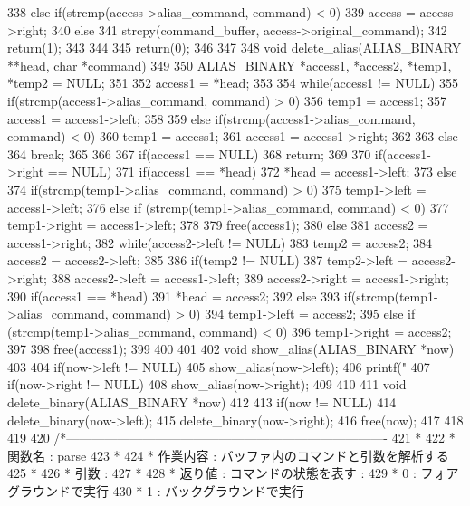 \documentclass{procreport}
\begin{document}
\begin{verbatimtab}
{{{   338			}else if(strcmp(access->alias_command, command) < 0){
   339				access = access->right;
   340			}else{
   341				strcpy(command_buffer, access->original_command);
   342				return(1);
   343			}
   344		}
   345			return(0);
   346	}
   347	
   348	void delete_alias(ALIAS_BINARY **head, char *command)
   349	{
   350		ALIAS_BINARY *access1, *access2, *temp1, *temp2 = NULL;
   351		
   352		access1 = *head;
   353		
   354		while(access1 != NULL){
   355			if(strcmp(access1->alias_command, command) > 0){
   356				temp1 = access1;
   357				access1 = access1->left;
   358			}
   359			else if(strcmp(access1->alias_command, command) < 0){
   360				temp1 = access1;
   361				access1 = access1->right;
   362			}
   363			else
   364				break;
   365		}
   366		
   367		if(access1 == NULL)
   368			return;
   369		
   370		if(access1->right == NULL){
   371			if(access1 == *head)
   372				*head = access1->left;
   373			else{
   374				if(strcmp(temp1->alias_command, command) > 0)
   375					temp1->left = access1->left;
   376				else if (strcmp(temp1->alias_command, command) < 0)
   377					temp1->right = access1->left;
   378			}
   379			free(access1);
   380		}else{
   381			access2 = access1->right;
   382			while(access2->left != NULL){
   383				temp2 = access2;
   384				access2 = access2->left;
   385			}
   386			if(temp2 != NULL)
   387				temp2->left = access2->right;
   388			access2->left = access1->left;
   389			access2->right = access1->right;
   390			if(access1 == *head)
   391				*head = access2;
   392			else{
   393				if(strcmp(temp1->alias_command, command) > 0)
   394					temp1->left = access2;
   395				else if (strcmp(temp1->alias_command, command) < 0)
   396					temp1->right = access2;
   397			}
   398			free(access1);
   399		}
   400	}
   401	
   402	void show_alias(ALIAS_BINARY *now)
   403	{
   404		if(now->left != NULL)
   405			show_alias(now->left);
   406		printf("%
   407		if(now->right != NULL)
   408			show_alias(now->right);
   409	}
   410	
   411	void delete_binary(ALIAS_BINARY *now)
   412	{
   413		if(now != NULL){
   414			delete_binary(now->left);
   415			delete_binary(now->right);
   416			free(now);
   417		}
   418	}
   419	
   420	/*----------------------------------------------------------------------------
   421	 *
   422	 *  関数名   : parse
   423	 *
   424	 *  作業内容 : バッファ内のコマンドと引数を解析する
   425	 *
   426	 *  引数	 :
   427	 *
   428	 *  返り値   : コマンドの状態を表す :
   429	 *				0 : フォアグラウンドで実行
   430	 *				1 : バックグラウンドで実行

\end{verbatimtab}
\end{document}
